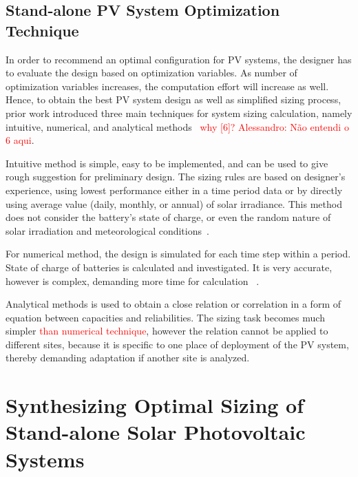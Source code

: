 \documentclass[review]{elsarticle}
\begin{document}
\subsection{Stand-alone PV System Optimization Technique}
In order to recommend an optimal configuration for PV systems, the designer has to evaluate the design based on optimization variables. As number of optimization variables increases, the computation effort will increase as well. Hence, to obtain the best PV system design as well as simplified sizing process, prior work introduced three main techniques for system sizing calculation, namely intuitive, numerical, and analytical methods~\cite{Alsadi2018} \textcolor{red}{why [6]? Alessandro: Não entendi o 6 aqui}.

Intuitive method is simple, easy to be implemented, and can be used to give rough suggestion for preliminary design. The sizing rules are based on designer's experience, using lowest performance either in a time period data or by directly using average value (daily, monthly, or annual) of solar irradiance. This method does not consider the battery's state of charge, or even the random nature of solar irradiation and meteorological conditions~\cite{Alsadi2018}.

For numerical method, the design is simulated for each time step within a period. State of charge of batteries is calculated and investigated. It is very accurate, however is complex, demanding more time for calculation \textcolor{red}{~\cite{Park2004}}.

Analytical methods is used to obtain a close relation or correlation in a form of equation between capacities and reliabilities. The sizing task becomes much simpler \textcolor{red}{than numerical technique}, however the relation cannot be applied to different sites, because it is specific to one place of deployment of the PV system, thereby demanding adaptation if another site is analyzed.

\section{Synthesizing Optimal Sizing of Stand-alone Solar Photovoltaic Systems}
\label{sec:Method}
\end{document}
